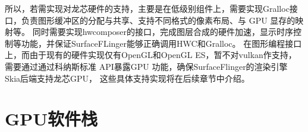 所以，若需实现对龙芯硬件的支持，主要是在低级别组件上，需要实现Gralloc接口，负责图形缓冲区的分配与共享、支持不同格式的像素布局、与 GPU 显存的映射等。
同时需要实现hwcomposer的接口，完成图层合成的硬件加速，显示时序控制等功能，并保证SurfaceFLinger能够正确调用HWC和Gralloc。
在图形编程接口上，而由于现有的硬件实现仅有OpenGL和OpenGL ES，暂不对vulkan作支持，需要通过通过科纳斯标准 API暴露GPU 功能，确保SurfaceFlinger的渲染引擎 Skia后端支持龙芯GPU，
这些具体支持实现将在后续章节中介绍。


\section{GPU软件栈}
